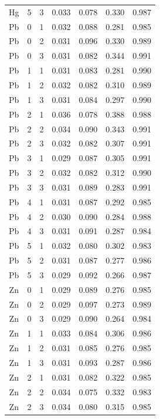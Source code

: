 \documentclass[ms, hidelinks]{uncgdissertationexp}
\theoremstyle{plain}
\theoremstyle{definition}
\theoremstyle{remark}
\begin{document}
\begin{longtable}{ccccccc}
Hg & 5 & 3 & 0.033 & 0.078 & 0.330 & 0.987\\
\rowcolor{gray!6}  Pb & 0 & 1 & 0.032 & 0.088 & 0.281 & 0.985\\
Pb & 0 & 2 & 0.031 & 0.096 & 0.330 & 0.989\\
\rowcolor{gray!6}  Pb & 0 & 3 & 0.031 & 0.082 & 0.344 & 0.991\\
Pb & 1 & 1 & 0.031 & 0.083 & 0.281 & 0.990\\
\rowcolor{gray!6}  Pb & 1 & 2 & 0.032 & 0.082 & 0.310 & 0.989\\
Pb & 1 & 3 & 0.031 & 0.084 & 0.297 & 0.990\\
\rowcolor{gray!6}  Pb & 2 & 1 & 0.036 & 0.078 & 0.388 & 0.988\\
Pb & 2 & 2 & 0.034 & 0.090 & 0.343 & 0.991\\
\rowcolor{gray!6}  Pb & 2 & 3 & 0.032 & 0.082 & 0.307 & 0.991\\
Pb & 3 & 1 & 0.029 & 0.087 & 0.305 & 0.991\\
\rowcolor{gray!6}  Pb & 3 & 2 & 0.032 & 0.082 & 0.312 & 0.990\\
Pb & 3 & 3 & 0.031 & 0.089 & 0.283 & 0.991\\
\rowcolor{gray!6}  Pb & 4 & 1 & 0.031 & 0.087 & 0.292 & 0.985\\
Pb & 4 & 2 & 0.030 & 0.090 & 0.284 & 0.988\\
\rowcolor{gray!6}  Pb & 4 & 3 & 0.031 & 0.091 & 0.287 & 0.984\\
Pb & 5 & 1 & 0.032 & 0.080 & 0.302 & 0.983\\
\rowcolor{gray!6}  Pb & 5 & 2 & 0.031 & 0.087 & 0.277 & 0.986\\
Pb & 5 & 3 & 0.029 & 0.092 & 0.266 & 0.987\\
\rowcolor{gray!6}  Zn & 0 & 1 & 0.029 & 0.089 & 0.276 & 0.985\\
Zn & 0 & 2 & 0.029 & 0.097 & 0.273 & 0.989\\
\rowcolor{gray!6}  Zn & 0 & 3 & 0.029 & 0.090 & 0.264 & 0.984\\
Zn & 1 & 1 & 0.033 & 0.084 & 0.306 & 0.986\\
\rowcolor{gray!6}  Zn & 1 & 2 & 0.031 & 0.085 & 0.276 & 0.985\\
Zn & 1 & 3 & 0.031 & 0.093 & 0.287 & 0.986\\
\rowcolor{gray!6}  Zn & 2 & 1 & 0.031 & 0.082 & 0.322 & 0.985\\
Zn & 2 & 2 & 0.034 & 0.075 & 0.332 & 0.983\\
\rowcolor{gray!6}  Zn & 2 & 3 & 0.034 & 0.080 & 0.315 & 0.985\\

\end{longtable}
\end{document}
